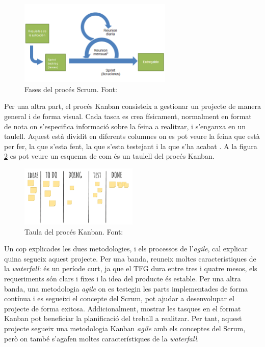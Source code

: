 \documentclass[a4paper]{article}
\begin{document}
\begin{figure}[H]
    \centering
    \includegraphics[width=0.65\textwidth]{images/Scrumm.png}
    \caption{Fases del procés Scrum. Font: \cite{wikipediaScrum}}
    \label{fig:ScrummImage}
\end{figure}

Per una altra part, el procés Kanban consisteix a gestionar un projecte de manera general i de forma visual. Cada tasca es crea físicament, normalment en format de nota  on s'especifica informació sobre la feina a realitzar, i s'enganxa en un taulell. Aquest està dividit en diferents columnes on es pot veure la feina que està per fer, la que s'esta fent, la que s'esta testejant i la que s'ha acabat \cite{kanbanWeb}. A la figura \ref{fig:KanbanImage} es pot veure un esquema de com és un taulell del procés Kanban.

\begin{figure}[H]
    \centering
    \includegraphics[width=0.5\textwidth]{images/Kanban.png}
    \caption{Taula del procés Kanban. Font: \cite{kanbanImage}}
    \label{fig:KanbanImage}
\end{figure}

Un cop explicades les dues metodologies, i els processos de l'\textit{agile}, cal explicar quina segueix aquest projecte. Per una banda, reuneix moltes característiques de la \textit{waterfall}: és un període curt, ja que el TFG dura entre tres i quatre mesos, els requeriments són clars i fixes i la idea del producte és estable. Per una altra banda, una metodologia \textit{agile} on es testegin les parts implementades de forma contínua i es segueixi el concepte del Scrum, pot ajudar a desenvolupar el projecte de forma exitosa. Addicionalment, mostrar les tasques en el format Kanban pot beneficiar la planificació del treball a realitzar. Per tant, aquest projecte segueix una metodologia Kanban \textit{agile} amb els conceptes del Scrum, però on també s'agafen moltes característiques de la \textit{waterfall}.
\end{document}
